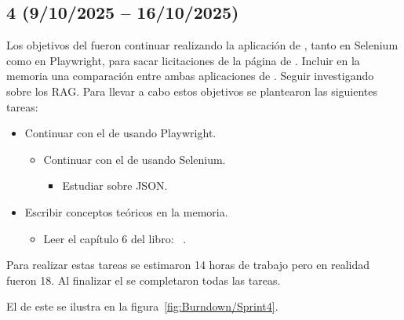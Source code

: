 \subsection{ 4 (9/10/2025 -- 16/10/2025)}
Los objetivos del  fueron continuar realizando la aplicación de , tanto en Selenium como en Playwright, para sacar licitaciones de la página de \contsec{}. Incluir en la memoria una comparación entre ambas aplicaciones de . Seguir investigando sobre los RAG.
Para llevar a cabo estos objetivos se plantearon las siguientes tareas:
\begin{itemize}
\tightlist
	\item Continuar con el  de  usando Playwright.
	\begin{itemize}
	\tightlist
		\item Continuar con el  de  usando Selenium.
		\begin{itemize}
		\tightlist
			\item Estudiar sobre JSON.
		\end{itemize}
	\end{itemize}
	\item Escribir conceptos teóricos en la memoria.
	\begin{itemize}
	\tightlist
		\item Leer el capítulo 6 del libro: ~\cite{book:RAG_SimpleGuide}.
	\end{itemize}
\end{itemize}

Para realizar estas tareas se estimaron 14 horas de trabajo pero en realidad fueron 18. Al finalizar el  se completaron todas las tareas.

El  de este  se ilustra en la figura~\ref{fig:Burndown/Sprint4}.


